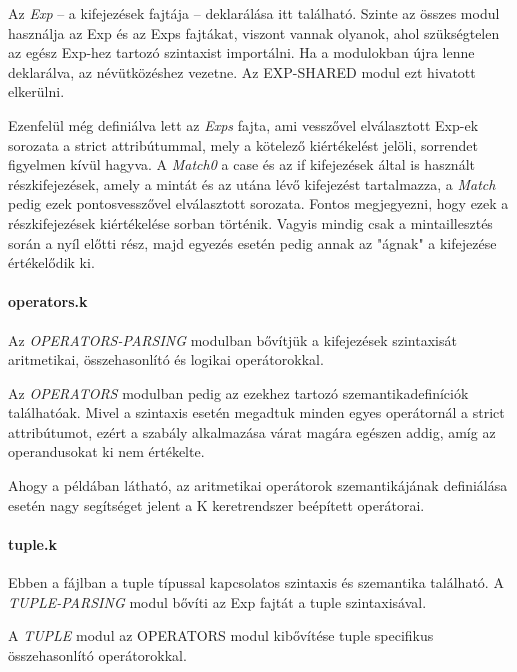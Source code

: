 

Az \textit{Exp} -- a kifejezések fajtája -- deklarálása itt található. Szinte az összes modul használja az Exp és az Exps fajtákat, viszont vannak olyanok, ahol szükségtelen az egész Exp-hez tartozó szintaxist importálni. Ha a modulokban újra lenne deklarálva, az névütközéshez vezetne. Az EXP-SHARED modul ezt hivatott elkerülni.

Ezenfelül még definiálva lett az \textit{Exps} fajta, ami vesszővel elválasztott Exp-ek sorozata a strict attribútummal, mely a kötelező kiértékelést jelöli, sorrendet figyelmen kívül hagyva. A \textit{Match0} a case és az if kifejezések által is használt részkifejezések, amely a mintát és az utána lévő kifejezést tartalmazza, a \textit{Match} pedig ezek pontosvesszővel elválasztott sorozata. Fontos megjegyezni, hogy ezek a részkifejezések kiértékelése sorban történik. Vagyis mindig csak a mintaillesztés során a nyíl előtti rész, majd egyezés esetén pedig annak az "ágnak" a kifejezése értékelődik ki.

\paragraph{operators.k}
Az \textit{OPERATORS-PARSING} modulban bővítjük a kifejezések szintaxisát aritmetikai, összehasonlító és logikai operátorokkal.



Az \textit{OPERATORS} modulban pedig az ezekhez tartozó szemantikadefiníciók találhatóak. Mivel a szintaxis esetén megadtuk minden egyes operátornál a strict attribútumot, ezért a szabály alkalmazása várat magára egészen addig, amíg az operandusokat ki nem értékelte.



Ahogy a példában látható, az aritmetikai operátorok szemantikájának definiálása esetén nagy segítséget jelent a K keretrendszer beépített operátorai.

\paragraph{tuple.k}
Ebben a fájlban a tuple típussal kapcsolatos szintaxis és szemantika található. A \textit{TUPLE-PARSING} modul bővíti az Exp fajtát a tuple szintaxisával.



A \textit{TUPLE} modul az OPERATORS modul kibővítése tuple specifikus összehasonlító operátorokkal.

